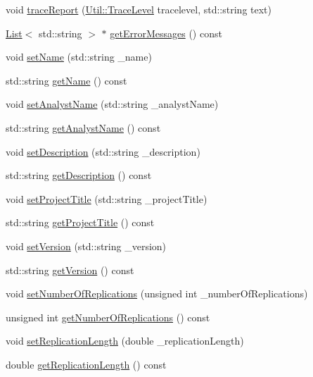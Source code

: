 \begin{DoxyCompactItemize}
\item 
void \hyperlink{class_model_ab601f70b29eed01e6a495924c852caf0}{trace\-Report} (\hyperlink{class_util_a604561d00f5999b5ca280401140e58d9}{Util\-::\-Trace\-Level} tracelevel, std\-::string text)
\item 
\hyperlink{class_list}{List}$<$ std\-::string $>$ $\ast$ \hyperlink{class_model_ae0d77f48384e180cfabb8fd8ed16e4db}{get\-Error\-Messages} () const 
\item 
void \hyperlink{class_model_a2aab01a2871b2924eeb3c265267fabef}{set\-Name} (std\-::string \-\_\-name)
\item 
std\-::string \hyperlink{class_model_a1a1c7e795ee409d8e61c942db5f94d17}{get\-Name} () const 
\item 
void \hyperlink{class_model_a52c044c61c8411b083006d2c5fbe0abf}{set\-Analyst\-Name} (std\-::string \-\_\-analyst\-Name)
\item 
std\-::string \hyperlink{class_model_a9b539226cc78c36bfe911252e9ccd055}{get\-Analyst\-Name} () const 
\item 
void \hyperlink{class_model_a84eb0333d18ac7f8a684d1cd32c64dbd}{set\-Description} (std\-::string \-\_\-description)
\item 
std\-::string \hyperlink{class_model_a40ad9af9a5cebe907d483fb51d0f4974}{get\-Description} () const 
\item 
void \hyperlink{class_model_a97ce94d618caee4364e82a8790f00052}{set\-Project\-Title} (std\-::string \-\_\-project\-Title)
\item 
std\-::string \hyperlink{class_model_ae2197c7da38542ec199491c3d5797efd}{get\-Project\-Title} () const 
\item 
void \hyperlink{class_model_a630f152feb166751ecf53e5c628a7826}{set\-Version} (std\-::string \-\_\-version)
\item 
std\-::string \hyperlink{class_model_a073ecbf56dfd06e46af31bbd67a0402d}{get\-Version} () const 
\item 
void \hyperlink{class_model_a55d597e867b5c3e27cb2e1511414e7f3}{set\-Number\-Of\-Replications} (unsigned int \-\_\-number\-Of\-Replications)
\item 
unsigned int \hyperlink{class_model_af2fe357b860298f4977f8f48cee7115a}{get\-Number\-Of\-Replications} () const 
\item 
void \hyperlink{class_model_a5be13e4bb83891e8caed52b3eae1470f}{set\-Replication\-Length} (double \-\_\-replication\-Length)
\item 
double \hyperlink{class_model_a6bb4d4fbf90f49c990a00385a9df18d9}{get\-Replication\-Length} () const 

\end{DoxyCompactItemize}
